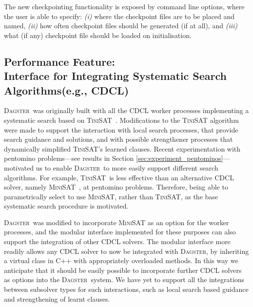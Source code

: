 \documentclass[10pt,a4paper,oneside,headinclude,footinclude,BCOR5mm]{scrartcl}
\newcommand{\dagster}{\textsc{Dagster}\xspace}
\newcommand{\tinisat}{\textsc{TiniSAT}\xspace}
\begin{document}
The new checkpointing functionality is exposed by command line options, where the user is able to specify: {\em (i)}  where the checkpoint files are to be placed and named, {\em (ii)} how often checkpoint files should be generated (if at all), and {\em (iii)} what (if any) checkpoint file should be loaded on initialisation.%


\subsection{Performance Feature: \\Interface for Integrating Systematic Search Algorithms(e.g., CDCL)} %
\label{sec:minisat_integration}

\dagster\ was originally built with all the CDCL worker processes implementing a systematic search based on
\textsc{TiniSAT}~\cite{huang2007tinisat,huang:and:veloso:2007}.
Modifications to the \textsc{TiniSAT} algorithm were made to support the interaction with local search processes, that  provide search guidance and solutions, and with possible strengthener processes that dynamically simplified \tinisat's learned clauses.
Recent experimentation with pentomino problems---see results in Section \ref{sec:experiment_pentominos}---motivated us to enable \dagster\ to more easily support different search algorithms.
For example, \tinisat\ is less effective than an alternative CDCL solver, namely \textsc{MiniSAT}~\cite{een2003extensible}, at pentomino problems. Therefore, being able to parametrically select to use  \textsc{MiniSAT}, rather than \textsc{TiniSAT}, as the base systematic search procedure is motivated. %

\dagster\ was modified to incorporate \textsc{MiniSAT} as an option for the worker processes, and the modular interface implemented for these purposes can also support the integration of other CDCL solvers.
The modular interface more readily allows any CDCL solver to now be integrated with \dagster, by inheriting a virtual class in \textsc{C++} with appropriately overloaded methods.
In this way we anticipate that it should be easily possible to incorporate further CDCL solvers as options into the \dagster\ system.
We have yet to support all the integrations between subsolver types for such interactions, such as local search based guidance and strengthening of learnt clauses. 
\end{document}
